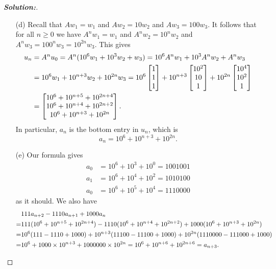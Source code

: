 \documentclass[a4paper]{amsart}
\theoremstyle{definition}
\newenvironment{solution}{\begin{proof}[\textbf{Solution:}] \vphantom{u}}{\end{proof}}
\begin{document}
\begin{solution}
\begin{itemize}
  \item[(d)] Recall that $Aw_1=w_1$ and $Aw_2=10w_2$ and
   $Aw_3=100w_3$.  It follows that for all $n\geq 0$ we have
   $A^nw_1=w_1$ and $A^nw_2=10^nw_2$ and
   $A^nw_3=100^nw_3=10^{2n}w_3$.  This gives
   \begin{align*}
    u_n &= A^nu_0 
         = A^n(10^6 w_1 + 10^3 w_2 + w_3) 
         = 10^6 A^nw_1 + 10^3 A^nw_2 + A^nw_3 \\
        &= 10^6w_1 + 10^{n+3}w_2 + 10^{2n}w_3 
         = 10^6     \left[\begin{matrix} 1    \\ 1    \\ 1 \end{matrix}\right] + 
           10^{n+3} \left[\begin{matrix} 10^2 \\ 10   \\ 1 \end{matrix}\right] + 
           10^{2n}  \left[\begin{matrix} 10^4 \\ 10^2 \\ 1 \end{matrix}\right] \\
        &= \left[\begin{matrix} 10^6 + 10^{n+5} + 10^{2n+4} \\
                10^6 + 10^{n+4} + 10^{2n+2} \\
                10^6 + 10^{n+3} + 10^{2n} \end{matrix}\right].
   \end{align*}
   In particular, $a_n$ is the bottom entry in $u_n$, which is
   \[ a_n = 10^6 + 10^{n+3} + 10^{2n}. \]
  \item[(e)] Our formula gives
   \begin{align*}
    a_0 &= 10^6 + 10^{3} + 10^{0} = 1001001 \\
    a_1 &= 10^6 + 10^{4} + 10^{2} = 1010100 \\
    a_0 &= 10^6 + 10^{5} + 10^{4} = 1110000 
   \end{align*}
   as it should.  We also have
   \begin{align*}
      & 111a_{n+2}-1110 a_{n+1}+1000a_n \\
     =& 111(10^6 + 10^{n+5} + 10^{2n+4}) - 
        1110(10^6 + 10^{n+4} + 10^{2n+2}) +
        1000(10^6 + 10^{n+3} + 10^{2n}) \\
     =& 10^6(111-1110+1000) + 
        10^{n+3}(11100-11100+1000) +
        10^{2n}(1110000-111000+1000) \\
     =& 10^6 + 1000\times 10^{n+3} + 1000000\times 10^{2n} 
     =  10^6 + 10^{n+6} + 10^{2n+6} = a_{n+3}.
   \end{align*}
 \end{itemize}
\end{solution}
\end{document}
